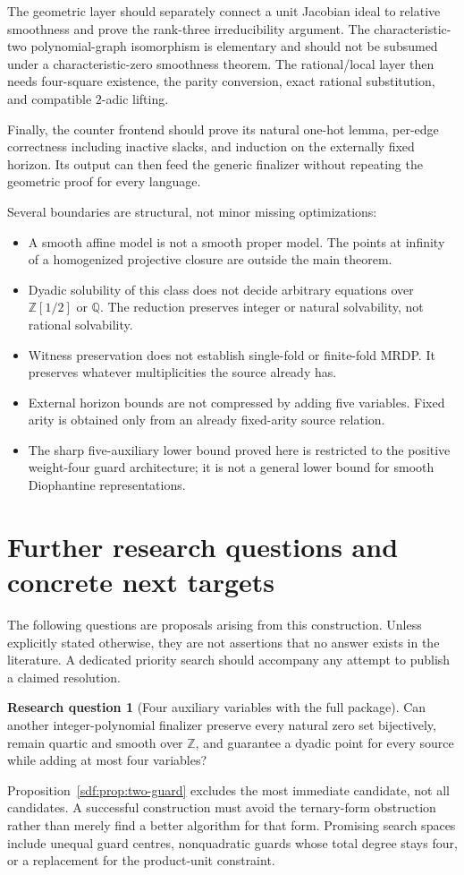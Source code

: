 \documentclass[11pt,a4paper]{article}
\theoremstyle{definition}
\newtheorem{question}[theorem]{Research question}
\theoremstyle{remark}
\newcommand{\Z}{\mathbb Z}
\newcommand{\Q}{\mathbb Q}
\begin{document}
The geometric layer should separately connect a unit Jacobian ideal to
relative smoothness and prove the rank-three irreducibility argument.
The characteristic-two polynomial-graph isomorphism is elementary and
should not be subsumed under a characteristic-zero smoothness theorem.
The rational/local layer then needs four-square existence, the parity
conversion, exact rational substitution, and compatible $2$-adic lifting.

Finally, the counter frontend should prove its natural one-hot lemma,
per-edge correctness including inactive slacks, and induction on the
externally fixed horizon. Its output can then feed the generic finalizer
without repeating the geometric proof for every language.

Several boundaries are structural, not minor missing optimizations:
\begin{itemize}
\item A smooth affine model is not a smooth proper model. The points at
infinity of a homogenized projective closure are outside the main theorem.
\item Dyadic solubility of this class does not decide arbitrary equations
over $\Z[1/2]$ or $\Q$. The reduction preserves integer or natural
solvability, not rational solvability.
\item Witness preservation does not establish single-fold or finite-fold
MRDP. It preserves whatever multiplicities the source already has.
\item External horizon bounds are not compressed by adding five variables.
Fixed arity is obtained only from an already fixed-arity source relation.
\item The sharp five-auxiliary lower bound proved here is restricted to the
positive weight-four guard architecture; it is not a general lower bound
for smooth Diophantine representations.
\end{itemize}

\section{Further research questions and concrete next targets}\label{sdf:sec:future}

The following questions are proposals arising from this construction.
Unless explicitly stated otherwise, they are not assertions that no answer
exists in the literature. A dedicated priority search should accompany any
attempt to publish a claimed resolution.

\begin{question}[Four auxiliary variables with the full package]\label{sdf:q:four}
Can another integer-polynomial finalizer preserve every natural zero set
bijectively, remain quartic and smooth over $\Z$, and guarantee a dyadic
point for every source while adding at most four variables?
\end{question}
Proposition~\ref{sdf:prop:two-guard} excludes the most immediate candidate,
not all candidates. A successful construction must avoid the ternary-form
obstruction rather than merely find a better algorithm for that form.
Promising search spaces include unequal guard centres, nonquadratic guards
whose total degree stays four, or a replacement for the product-unit
constraint.
\end{document}
